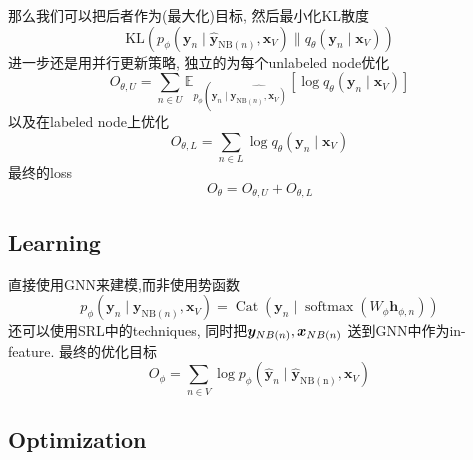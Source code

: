 \documentclass{article}
\begin{document}
    那么我们可以把后者作为(最大化)目标, 然后最小化KL散度
    \begin{equation}
        \mathrm{KL}\left(p_{\phi}\left(\mathbf{y}_{n} \mid \hat{\mathbf{y}}_{\mathrm{NB}(n)}, \mathbf{x}_{V}\right) \| q_{\theta}\left(\mathbf{y}_{n} \mid \mathbf{x}_{V}\right)\right)
    \end{equation}
    进一步还是用并行更新策略, 独立的为每个unlabeled node优化
    \begin{equation}
        O_{\theta, U}=\sum_{n \in U} \mathbb{E}_{p_{\phi}\left(\mathbf{y}_{n} \mid \hat{\left.\mathbf{y}_{\mathrm{NB}(n)}, \mathbf{x}_{V}\right)}\right.}\left[\log q_{\theta}\left(\mathbf{y}_{n} \mid \mathbf{x}_{V}\right)\right]
    \end{equation}
    以及在labeled node上优化
    \begin{equation}
        O_{\theta, L}=\sum_{n \in L} \log q_{\theta}\left(\mathbf{y}_{n} \mid \mathbf{x}_{V}\right)
    \end{equation}
    最终的loss
    \begin{equation}
        O_{\theta}=O_{\theta, U}+O_{\theta, L}
    \end{equation}

\subsection{Learning}
    
    直接使用GNN来建模,而非使用势函数
    \begin{equation}
        p_{\phi}\left(\mathbf{y}_{n} \mid \mathbf{y}_{\mathrm{NB}(n)}, \mathbf{x}_{V}\right)=\operatorname{Cat}\left(\mathbf{y}_{n} \mid \operatorname{softmax}\left(W_{\phi} \mathbf{h}_{\phi, n}\right)\right)
    \end{equation}
    还可以使用SRL中的techniques, 同时把$\boldsymbol{y}_{NB(n)}, \boldsymbol{x}_{NB(n)}$ 送到GNN中作为in-feature. 最终的优化目标
    \begin{equation}
        O_{\phi}=\sum_{n \in V} \log p_{\phi}\left(\hat{\mathbf{y}}_{n} \mid \hat{\mathbf{y}}_{\mathrm{NB}(\mathrm{n})}, \mathbf{x}_{V}\right)
    \end{equation}

\subsection{Optimization}
\end{document}
